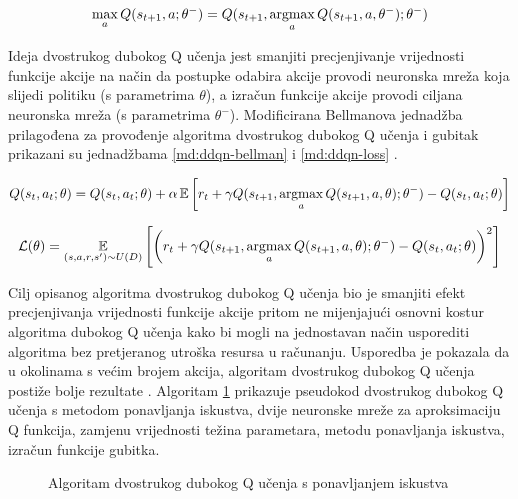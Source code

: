 \begin{equation}
    \label{md:dqn-overest}
    \max_a Q(s_{t+1}, a; \theta^-) =  Q(s_{t+1}, \operatorname*{argmax}_a Q(s_{t+1}, a, \theta^-); \theta^-)
\end{equation}

\bigskip

Ideja dvostrukog dubokog Q učenja jest smanjiti precjenjivanje vrijednosti funkcije akcije na način da postupke odabira akcije provodi neuronska mreža koja slijedi politiku (s parametrima $\theta$), a izračun funkcije akcije provodi ciljana neuronska mreža (s parametrima $\theta^-$). Modificirana Bellmanova jednadžba prilagođena za provođenje algoritma dvostrukog dubokog Q učenja i gubitak prikazani su jednadžbama \ref{md:ddqn-bellman} i \ref{md:ddqn-loss} \cite{DQN-MlAi}.  

\begin{equation}
    \label{md:ddqn-bellman}
    Q(s_t, a_t; \theta) = Q(s_t, a_t; \theta) + \alpha \operatorname*{\mathbb{E}} \left[ r_t + \gamma Q(s_{t+1}, \operatorname*{argmax}_a Q(s_{t+1}, a, \theta); \theta^-) - Q(s_t, a_t; \theta) \right]
\end{equation}

\begin{equation}
    \label{md:ddqn-loss}
    \mathcal{L}(\theta) = \operatorname*{\mathbb{E}}_{(s,a,r,s') \sim U(D)} \left[ \left(  r_t + \gamma Q(s_{t+1}, \operatorname*{argmax}_a Q(s_{t+1}, a, \theta); \theta^-) - Q(s_t, a_t; \theta) \right)^2 \right]
\end{equation}

\bigskip

Cilj opisanog algoritma dvostrukog dubokog Q učenja bio je smanjiti efekt precjenjivanja vrijednosti funkcije akcije pritom ne mijenjajući osnovni kostur algoritma dubokog Q učenja kako bi mogli na jednostavan način usporediti algoritma bez pretjeranog utroška resursa u računanju. Usporedba je pokazala da u okolinama s većim brojem akcija, algoritam dvostrukog dubokog Q učenja postiže bolje rezultate \cite{DDQL}. Algoritam \ref{fig:ddql-algorithm} prikazuje pseudokod dvostrukog dubokog Q učenja s metodom ponavljanja iskustva, dvije neuronske mreže za aproksimaciju Q funkcija, zamjenu vrijednosti težina parametara, metodu ponavljanja iskustva, izračun funkcije gubitka. 

\begin{figure}[H]
    \centering
    \caption{Algoritam dvostrukog dubokog Q učenja s ponavljanjem iskustva}
    \label{fig:ddql-algorithm}
\end{figure}

